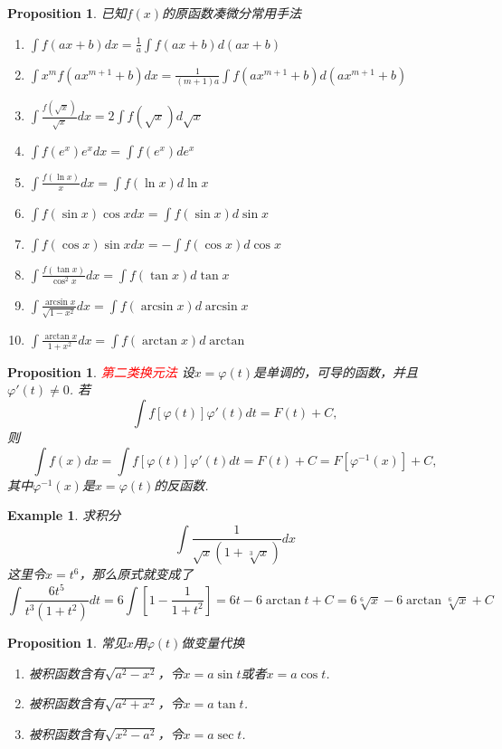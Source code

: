 \documentclass{article}
\newtheorem{proposition}[theorem]{Proposition}
\newtheorem{example}[theorem]{Example}
\newcommand{\redt}[1]{\textcolor{red}{#1}}
\begin{document}
\begin{proposition}
\rm 已知$f(x)$的原函数凑微分常用手法
\begin{enumerate}
	\item $\int f(ax+b)dx = \frac{1}{a} \int f(ax+b)d(ax+b)$
	\item $\int x^m f(ax^{m+1}+b)dx = \frac{1}{(m+1)a}\int f(ax^{m+1}+b)d(ax^{m+1}+b)$
	\item $\int \frac{f(\sqrt{x})}{\sqrt{x}}dx = 2 \int f(\sqrt{x})d\sqrt{x}$
	\item $\int f(e^x)e^xdx = \int f(e^x)de^x$
	\item $\int \frac{f(\ln x)}{x}dx = \int f(\ln x)d\ln x$
	\item $\int f(\sin x)\cos x dx = \int f(\sin x)d\sin x$
	\item $\int f(\cos x)\sin x dx = -\int f(\cos x)d\cos x$
	\item $\int \frac{f(\tan x)}{\cos^2 x}dx = \int f(\tan x)d \tan x$
	\item $\int \frac{\arcsin x}{\sqrt{1-x^2}}dx = \int f(\arcsin x)d\arcsin x$
	\item $\int \frac{\arctan x}{1+x^2}dx = \int f(\arctan x) d\arctan $
\end{enumerate}
\end{proposition}

\begin{proposition}
\rm \redt{第二类换元法} 设$x = \varphi(t)$是单调的，可导的函数，并且$\varphi'(t) \neq 0$. 若
$$
\int f[\varphi(t)]\varphi'(t)dt = F(t)+C,
$$
则
$$
\int f(x)dx = \int f[\varphi(t)]\varphi'(t)dt = F(t) + C = F[\varphi^{-1}(x)]+C,
$$
其中$\varphi^{-1}(x)$是$x=\varphi(t)$的反函数. 
\end{proposition}

\begin{example}
\rm 求积分
$$
\int \frac{1}{\sqrt{x}(1+\sqrt[3]{x})}dx
$$
这里令$x=t^6$，那么原式就变成了
$$
\int \frac{6t^5}{t^3(1+t^2)}dt = 6\int \left[ 1-\frac{1}{1+t^2} \right] = 6t-6\arctan t + C = 6\sqrt[6]{x}-6\arctan \sqrt[6]{x} + C
$$
\end{example}

\begin{proposition}
\rm 常见$x$用$\varphi(t)$做变量代换
\begin{enumerate}
	\item 被积函数含有$\sqrt{a^2-x^2}$，令$x=a\sin t$或者$x=a\cos t$.
	\item 被积函数含有$\sqrt{a^2 + x^2}$，令$x=a\tan t$.
	\item 被积函数含有$\sqrt{x^2-a^2}$，令$x=a\sec t$. 
\end{enumerate}
\end{proposition}
\end{document}
